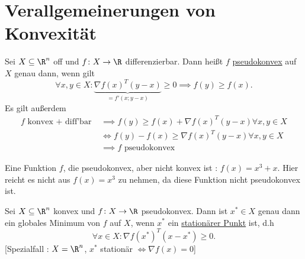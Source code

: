 \section{Verallgemeinerungen von Konvexität}%
\label{sec:Verallgemeinerungen von Konvexität}

\begin{definition}
\label{thm:pseudokonvexität}
	Sei $X \subseteq \R^{n}$ off und $f \colon X \rightarrow \R $ differenzierbar. Dann heißt $f$ \underline{pseudokonvex} auf $X$ genau dann, wenn gilt 
	\[
		\forall x,y \in X \colon \underbrace{\nabla f(x)^{T}(y-x)}_{=f'(x; y-x)} \geq 0 \implies f(y) \geq f(x)
	.\] 
Es gilt außerdem
\begin{align*}
	f \text{ konvex + diff'bar } & \implies f(y) \geq f(x) + \nabla f(x)^{T}(y-x) \forall x,y \in X \\
								 & \iff f(y) - f(x) \geq \nabla f(x)^{T}(y-x) \forall x,y \in X \\
								 &\implies f \text{ pseudokonvex}
\end{align*}
\end{definition}


\begin{beispiel}
\label{thm:bsppseudokonvex}
Eine Funktion $f$, die pseudokonvex, aber nicht konvex ist : $f(x) = x^{3} + x$. Hier reicht es nicht aus $f(x)=x^{3}$ zu nehmen, da diese Funktion nicht pseudokonvex ist.
\end{beispiel}

\begin{satz}
\label{thm:stationäresatz}
	Sei $X \subseteq \R^{n}$ konvex und $f \colon X \rightarrow \R $ pseudokonvex. Dann ist ${x}^{*} \in X$ genau dann ein globales Minimum von $f$ auf $X$, wenn ${x}^{*}$ ein \underline{stationärer Punkt} ist, d.h
	\[
		\forall x \in X \colon \nabla f({x}^{*})^{T}(x-{x}^{*}) \geq 0
	.\]
	[Spezialfall : $X = \R^{n}$, ${x}^{*}$ stationär $\iff \nabla f(x) = 0$]
\end{satz}

